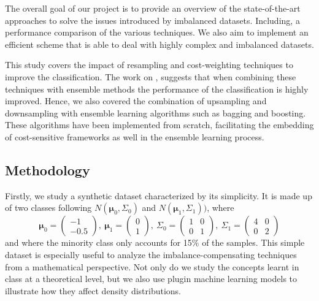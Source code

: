 \documentclass[conference]{IEEEtran}
\begin{document}
	The overall goal of our project is to provide an overview of the state-of-the-art approaches to solve the issues introduced by imbalanced datasets. Including, a performance comparison of the various techniques. We also aim to implement an efficient scheme that is able to deal with highly complex and imbalanced datasets.

This study covers the impact of resampling and cost-weighting techniques to improve the classification. The work on \cite{ensembles_review}, suggests that when combining these techniques with ensemble methods the performance of the classification is highly improved. Hence, we also covered the combination of upsampling and downsampling with ensemble learning algorithms such as bagging and boosting. These algorithms have been implemented from scratch, facilitating the embedding of cost-sensitive frameworks as well in the ensemble learning process. 

	\subsection{Methodology}
	Firstly, we study a synthetic dataset characterized by its simplicity. It is made up of two classes following $N(\boldsymbol\mu_0, \Sigma_0)$ and $N(\boldsymbol\mu_1, \Sigma_1))$, where
			\begin{equation*}
				\boldsymbol\mu_0=
				\begin{pmatrix}
					-1\\
					-0.5
				\end{pmatrix},\ %
				\boldsymbol\mu_1=
				\begin{pmatrix}
					0\\
					1
				\end{pmatrix},\ %
				\Sigma_0=
				\begin{pmatrix}
					1 & 0\\
					0 & 1
				\end{pmatrix},\ %
				\Sigma_1=
				\begin{pmatrix}
					4 & 0\\
					0 & 2
				\end{pmatrix}
			\end{equation*} and where the minority class only accounts for 15\% of the samples. This simple dataset is especially useful to analyze the imbalance-compensating techniques from a mathematical perspective. Not only do we study the concepts learnt in class at a theoretical level, but we also use plugin machine learning models to illustrate how they affect density distributions.
\end{document}
